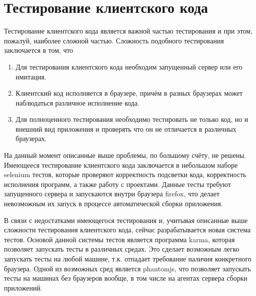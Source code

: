 \section{Тестирование клиентского кода}
	Тестирование клиентского кода является важной частью тестирования и при этом, пожалуй, наиболее сложной частью. Сложность подобного тестирования заключается в том, что
\begin{enumerate}
	\item  Для тестирования клиентского кода необходим запущенный сервер или его имитация.
	\item Клиентский код исполняется в браузере, причём в разных браузерах может наблюдаться  различное исполнение кода.
	\item Для полноценного тестирования необходимо тестировать не только код, но и внешний вид приложения и проверять что он не отличается в различных браузерах.
\end{enumerate}

	На данный момент описанные выше проблемы, по большому счёту, не решены. Имеющееся тестирование клиентского кода заключается в небольшом наборе selenium тестов, которые проверяют корректность подсветки кода, корректность исполнения программ, а также работу с проектами. Данные тесты требуют запущенного сервера и запускаются внутри браузера firefox, что делает невозможным их запуск в процессе автоматической сборки приложения.
	
	В связи с недостатками имеющегося тестирования и, учитывая описанные выше сложности тестирования клиентского кода, сейчас разрабатывается новая система тестов. 
Основой данной системы тестов является программа karma, которая позволяет запускать тесты в различных средах. Это сделает возможным легко запускать тесты на любой машине, т.к. отпадает требование наличия конкретного браузера. Одной из возможных сред является phantomjs, что позволяет запускать тесты на машинах без браузеров вообще, в том числе на агентах сервера сборки приложений. 
	
	